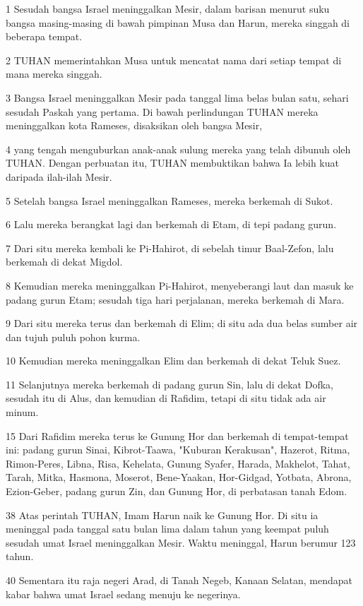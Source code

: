 \par 1 Sesudah bangsa Israel meninggalkan Mesir, dalam barisan menurut suku bangsa masing-masing di bawah pimpinan Musa dan Harun, mereka singgah di beberapa tempat.
\par 2 TUHAN memerintahkan Musa untuk mencatat nama dari setiap tempat di mana mereka singgah.
\par 3 Bangsa Israel meninggalkan Mesir pada tanggal lima belas bulan satu, sehari sesudah Paskah yang pertama. Di bawah perlindungan TUHAN mereka meninggalkan kota Rameses, disaksikan oleh bangsa Mesir,
\par 4 yang tengah menguburkan anak-anak sulung mereka yang telah dibunuh oleh TUHAN. Dengan perbuatan itu, TUHAN membuktikan bahwa Ia lebih kuat daripada ilah-ilah Mesir.
\par 5 Setelah bangsa Israel meninggalkan Rameses, mereka berkemah di Sukot.
\par 6 Lalu mereka berangkat lagi dan berkemah di Etam, di tepi padang gurun.
\par 7 Dari situ mereka kembali ke Pi-Hahirot, di sebelah timur Baal-Zefon, lalu berkemah di dekat Migdol.
\par 8 Kemudian mereka meninggalkan Pi-Hahirot, menyeberangi laut dan masuk ke padang gurun Etam; sesudah tiga hari perjalanan, mereka berkemah di Mara.
\par 9 Dari situ mereka terus dan berkemah di Elim; di situ ada dua belas sumber air dan tujuh puluh pohon kurma.
\par 10 Kemudian mereka meninggalkan Elim dan berkemah di dekat Teluk Suez.
\par 11 Selanjutnya mereka berkemah di padang gurun Sin, lalu di dekat Dofka, sesudah itu di Alus, dan kemudian di Rafidim, tetapi di situ tidak ada air minum.
\par 15 Dari Rafidim mereka terus ke Gunung Hor dan berkemah di tempat-tempat ini: padang gurun Sinai, Kibrot-Taawa, "Kuburan Kerakusan", Hazerot, Ritma, Rimon-Peres, Libna, Risa, Kehelata, Gunung Syafer, Harada, Makhelot, Tahat, Tarah, Mitka, Hasmona, Moserot, Bene-Yaakan, Hor-Gidgad, Yotbata, Abrona, Ezion-Geber, padang gurun Zin, dan Gunung Hor, di perbatasan tanah Edom.
\par 38 Atas perintah TUHAN, Imam Harun naik ke Gunung Hor. Di situ ia meninggal pada tanggal satu bulan lima dalam tahun yang keempat puluh sesudah umat Israel meninggalkan Mesir. Waktu meninggal, Harun berumur 123 tahun.
\par 40 Sementara itu raja negeri Arad, di Tanah Negeb, Kanaan Selatan, mendapat kabar bahwa umat Israel sedang menuju ke negerinya.
